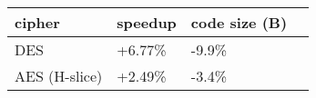 \begin{tabular}{|l K{3cm}|K{3cm}|K{3cm}|}
  \hline
  \textbf{cipher} & \textbf{speedup} & \textbf{code size (B)}\\
  \hline
  DES & +6.77\% & -9.9\% \\
  \hline
  AES (H-slice) & +2.49\% & -3.4\% \\
  \hline
\end{tabular}